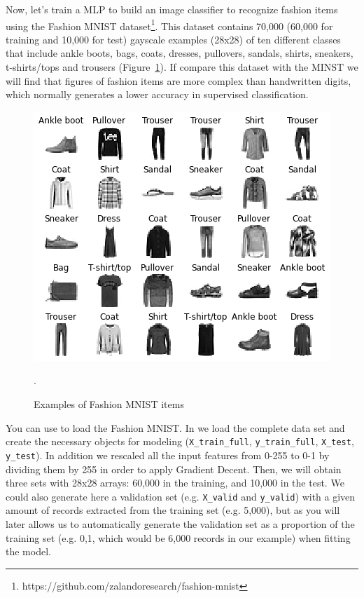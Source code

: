 Now, let's train a MLP to build an image classifier to recognize fashion items using the Fashion MNIST dataset\footnote{https://github.com/zalandoresearch/fashion-mnist}. This dataset contains 70,000 (60,000 for training and 10,000 for test) gayscale examples (28x28) of ten different classes that include ankle boots, bags, coats, dresses, pullovers, sandals, shirts, sneakers, t-shirts/tops and trousers (Figure~\ref{fig:fashion}). If compare this dataset with the MINST we will find that figures of fashion items are more complex than handwritten digits, which normally generates a lower accuracy in supervised classification.

\begin{figure}
\centering
\includegraphics[width=0.9\linewidth]{figures/ch15_fashion.png}
\caption{Examples of Fashion MNIST items}.
\label{fig:fashion}
\end{figure}

You can use  to load the Fashion MNIST. In  we load the complete data set and create the necessary objects for modeling (\texttt{X\_train\_full}, \texttt{y\_train\_full}, \texttt{X\_test}, \texttt{y\_test}). In addition we rescaled all the input features from 0-255 to 0-1 by dividing them by 255 in order to apply Gradient Decent. Then, we will obtain three sets with 28x28 arrays: 60,000 in the training, and 10,000 in the test. We could also generate here a validation set (e.g. \texttt{X\_valid} and \texttt{y\_valid}) with a given amount of records extracted from the training set (e.g. 5,000), but as you will later  allows us to automatically generate the validation set as a proportion of the training set (e.g. 0,1, which would be 6,000 records in our example) when fitting the model.

